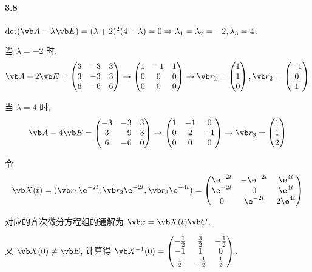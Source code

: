 \paragraph*{3.8} $\det(\vb A-\lambda\vb E)=(\lambda + 2)^2(4-\lambda) = 0\Rightarrow \lambda_1=\lambda_2=-2,\lambda_3=4$.

当 $\lambda=-2$ 时, 
\[
	\vb A+2\vb E=\begin{pmatrix}3&-3&3\\ 3&-3&3\\ 6&-6&6\end{pmatrix}\to\begin{pmatrix}1&-1&1\\ 0&0&0\\ 0&0&0\end{pmatrix}\to \vb r_1=\begin{pmatrix}1\\ 1\\ 0\end{pmatrix}, \vb r_2=\begin{pmatrix}-1\\ 0\\ 1\end{pmatrix}
\]

当 $\lambda=4$ 时,
\[
	\vb A-4\vb E=\begin{pmatrix}-3&-3&3\\ 3&-9&3\\ 6&-6&0\end{pmatrix}\to \begin{pmatrix}1&-1&0\\ 0&2&-1\\ 0&0&0\end{pmatrix}\to\vb r_3=\begin{pmatrix}1\\ 1\\ 2\end{pmatrix}
\]

令 
\[
	\vb X(t)=(\vb r_1\e^{-2t},\vb r_2\e^{-2t},\vb r_3\e^{-4t})=\begin{pmatrix}\e^{-2t}&-\e^{-2t}&\e^{4t}\\ \e^{-2t}&0&\e^{4t}\\ 0&\e^{-2t}&2\e^{4t}\end{pmatrix}
\]

对应的齐次微分方程组的通解为 $\vb x=\vb X(t)\vb C$.

又 $\vb X(0)\neq \vb E$, 计算得 $\vb X^{-1}(0)=\begin{pmatrix}-\frac{1}{2}&\frac{3}{2}&-\frac{1}{2}\\ -1&1&0\\ \frac{1}{2}&-\frac{1}{2}&\frac{1}{2}\end{pmatrix}$. 

